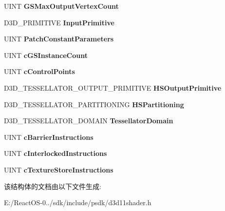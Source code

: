 \begin{DoxyCompactItemize}
U\+I\+NT {\bfseries G\+S\+Max\+Output\+Vertex\+Count}
\item 
\mbox{\label{struct___d3_d11___s_h_a_d_e_r___d_e_s_c_a5670e60e873a66bf141ad45b7fa67fc7}} 
D3\+D\+\_\+\+P\+R\+I\+M\+I\+T\+I\+VE {\bfseries Input\+Primitive}
\item 
\mbox{\label{struct___d3_d11___s_h_a_d_e_r___d_e_s_c_a32263a273eef278a170ba319d319916a}} 
U\+I\+NT {\bfseries Patch\+Constant\+Parameters}
\item 
\mbox{\label{struct___d3_d11___s_h_a_d_e_r___d_e_s_c_a8eb6582dc760bbb6385ce8278e5ba514}} 
U\+I\+NT {\bfseries c\+G\+S\+Instance\+Count}
\item 
\mbox{\label{struct___d3_d11___s_h_a_d_e_r___d_e_s_c_a11b22cb16753313aeec71004ba878965}} 
U\+I\+NT {\bfseries c\+Control\+Points}
\item 
\mbox{\label{struct___d3_d11___s_h_a_d_e_r___d_e_s_c_aa45ee0fbf8add59aac2d76216878b4ec}} 
D3\+D\+\_\+\+T\+E\+S\+S\+E\+L\+L\+A\+T\+O\+R\+\_\+\+O\+U\+T\+P\+U\+T\+\_\+\+P\+R\+I\+M\+I\+T\+I\+VE {\bfseries H\+S\+Output\+Primitive}
\item 
\mbox{\label{struct___d3_d11___s_h_a_d_e_r___d_e_s_c_a1bc2720cebd7ab808a6062b23a1b1866}} 
D3\+D\+\_\+\+T\+E\+S\+S\+E\+L\+L\+A\+T\+O\+R\+\_\+\+P\+A\+R\+T\+I\+T\+I\+O\+N\+I\+NG {\bfseries H\+S\+Partitioning}
\item 
\mbox{\label{struct___d3_d11___s_h_a_d_e_r___d_e_s_c_a6b1b20a5080bc8e30f7a67b4bd093917}} 
D3\+D\+\_\+\+T\+E\+S\+S\+E\+L\+L\+A\+T\+O\+R\+\_\+\+D\+O\+M\+A\+IN {\bfseries Tessellator\+Domain}
\item 
\mbox{\label{struct___d3_d11___s_h_a_d_e_r___d_e_s_c_ac1c67b39be89215f868800a442791f62}} 
U\+I\+NT {\bfseries c\+Barrier\+Instructions}
\item 
\mbox{\label{struct___d3_d11___s_h_a_d_e_r___d_e_s_c_a6fd8db62e863346376939d738b463cdb}} 
U\+I\+NT {\bfseries c\+Interlocked\+Instructions}
\item 
\mbox{\label{struct___d3_d11___s_h_a_d_e_r___d_e_s_c_ac59919118c29b33f188d336adf1d1ab9}} 
U\+I\+NT {\bfseries c\+Texture\+Store\+Instructions}
\end{DoxyCompactItemize}


该结构体的文档由以下文件生成\+:\begin{DoxyCompactItemize}
\item 
E\+:/\+React\+O\+S-\/0../sdk/include/psdk/d3d11shader.\+h\end{DoxyCompactItemize}
